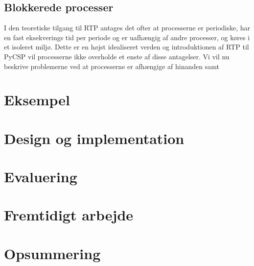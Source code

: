 \subsection{Blokkerede processer}
I den teoretiske tilgang til RTP antages det ofter at processerne er periodiske, har en fast eksekverings tid per periode og er uafhængig af andre processer, og køres i et isoleret miljø. Dette er en højst idealiseret verden og introduktionen af RTP til PyCSP vil processerne ikke overholde et enste af disse antagelser. 
Vi vil nu beskrive problemerne ved at processerne er afhængige af hinanden samt 



  \section{Eksempel}
  \section{Design og implementation}
  \section{Evaluering}
  \section{Fremtidigt arbejde}
  \section{Opsummering}
